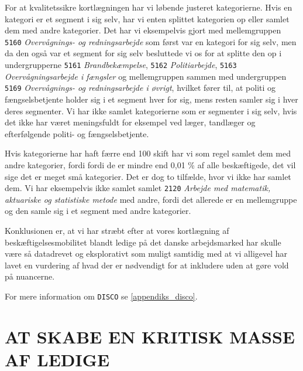 For at kvalitetssikre kortlægningen har vi løbende justeret kategorierne. Hvis en kategori er et segment i sig selv, har vi enten splittet kategorien op eller samlet dem med andre kategorier. Det har vi eksempelvis gjort med mellemgruppen \texttt{5160} \emph{Overvågnings- og redningsarbejde} som først var en kategori for sig selv, men da den også var et segment for sig selv besluttede vi os for at splitte den op i undergrupperne \texttt{5161} \emph{Brandbekæmpelse}, \texttt{5162} \emph{Politiarbejde}, \texttt{5163} \emph{Overvågningsarbejde i fængsler} og mellemgruppen sammen med undergruppen \texttt{5169} \emph{Overvågnings- og redningsarbejde i øvrigt}, hvilket fører til, at politi og fængselsbetjente holder sig i et segment hver for sig, mens resten samler sig i hver deres segmenter. Vi har ikke samlet kategorierne som er segmenter i sig selv, hvis det ikke har været meningsfuldt for eksempel ved læger, tandlæger og efterfølgende politi- og fængselsbetjente.

Hvis kategorierne har haft færre end 100 skift har vi som regel samlet dem med andre kategorier, fordi fordi de er mindre end 0,01 \% af alle beskæftigede, det vil sige det er meget små kategorier. Det er dog to tilfælde, hvor vi ikke har samlet dem. Vi har eksempelvis ikke samlet  samlet \texttt{2120} \emph{Arbejde med matematik, aktuariske og statistiske metode} med andre, fordi det allerede er en mellemgruppe og den samle sig i et segment med andre kategorier.

Konklusionen er, at vi har stræbt efter at vores kortlægning af beskæftigelsesmobilitet blandt ledige på det danske arbejdsmarked har skulle være så datadrevet og eksplorativt som muligt samtidig med at vi alligevel har lavet en vurdering af hvad der er nødvendigt for at inkludere uden at gøre vold på nuancerne.

For mere information om \texttt{DISCO} se \ref{appendiks_disco}.






\section{AT SKABE EN KRITISK MASSE AF LEDIGE \label{ledigskab}}


